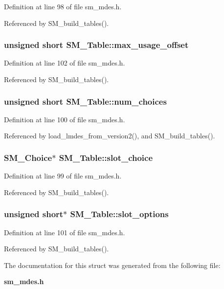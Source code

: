 Definition at line 98 of file sm\_\-mdes.h.

Referenced by SM\_\-build\_\-tables().
\subsubsection{\setlength{\rightskip}{0pt plus 5cm}unsigned short \bf{SM\_\-Table::max\_\-usage\_\-offset}}\label{structSM__Table_e8c6305a7872b2e7e6a03554037f1a51}




Definition at line 102 of file sm\_\-mdes.h.

Referenced by SM\_\-build\_\-tables().
\subsubsection{\setlength{\rightskip}{0pt plus 5cm}unsigned short \bf{SM\_\-Table::num\_\-choices}}\label{structSM__Table_19784b330e821f8944def28d84fc0af6}




Definition at line 100 of file sm\_\-mdes.h.

Referenced by load\_\-lmdes\_\-from\_\-version2(), and SM\_\-build\_\-tables().
\subsubsection{\setlength{\rightskip}{0pt plus 5cm}\bf{SM\_\-Choice}$\ast$ \bf{SM\_\-Table::slot\_\-choice}}\label{structSM__Table_f5625d537c93c0fa99ce081f3633dfb6}




Definition at line 99 of file sm\_\-mdes.h.

Referenced by SM\_\-build\_\-tables().
\subsubsection{\setlength{\rightskip}{0pt plus 5cm}unsigned short$\ast$ \bf{SM\_\-Table::slot\_\-options}}\label{structSM__Table_1fceac25ab450c1b89d3d63631da69f6}




Definition at line 101 of file sm\_\-mdes.h.

Referenced by SM\_\-build\_\-tables().

The documentation for this struct was generated from the following file:\begin{CompactItemize}
\item 
\bf{sm\_\-mdes.h}\end{CompactItemize}
